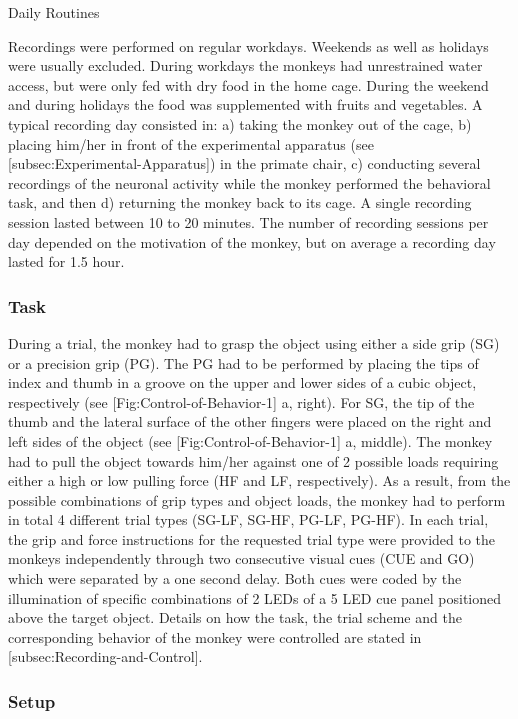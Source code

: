 Daily Routines

Recordings were performed on regular workdays. Weekends as well as holidays were usually excluded. During workdays the monkeys had unrestrained water access, but were only fed with dry food in the home cage. During the weekend and during holidays the food was supplemented with fruits and vegetables. A typical recording day consisted in: a) taking the monkey out of the cage, b) placing him/her in front of the experimental apparatus (see [subsec:Experimental-Apparatus]) in the primate chair, c) conducting several recordings of the neuronal activity while the monkey performed the behavioral task, and then d) returning the monkey back to its cage. A single recording session lasted between 10 to 20 minutes. The number of recording sessions per day depended on the motivation of the monkey, but on average a recording day lasted for 1.5 hour.

\subsubsection{Task}

During a trial, the monkey had to grasp the object using either a side grip (SG) or a precision grip (PG). The PG had to be performed by placing the tips of index and thumb in a groove on the upper and lower sides of a cubic object, respectively (see [Fig:Control-of-Behavior-1] a, right). For SG, the tip of the thumb and the lateral surface of the other fingers were placed on the right and left sides of the object (see [Fig:Control-of-Behavior-1] a, middle). The monkey had to pull the object towards him/her against one of 2 possible loads requiring either a high or low pulling force (HF and LF, respectively). As a result, from the possible combinations of grip types and object loads, the monkey had to perform in total 4 different trial types (SG-LF, SG-HF, PG-LF, PG-HF). In each trial, the grip and force instructions for the requested trial type were provided to the monkeys independently through two consecutive visual cues (CUE and GO) which were separated by a one second delay. Both cues were coded by the illumination of specific combinations of 2 LEDs of a 5 LED cue panel positioned above the target object. Details on how the task, the trial scheme and the corresponding behavior of the monkey were controlled are stated in [subsec:Recording-and-Control].

\subsubsection{Setup}



